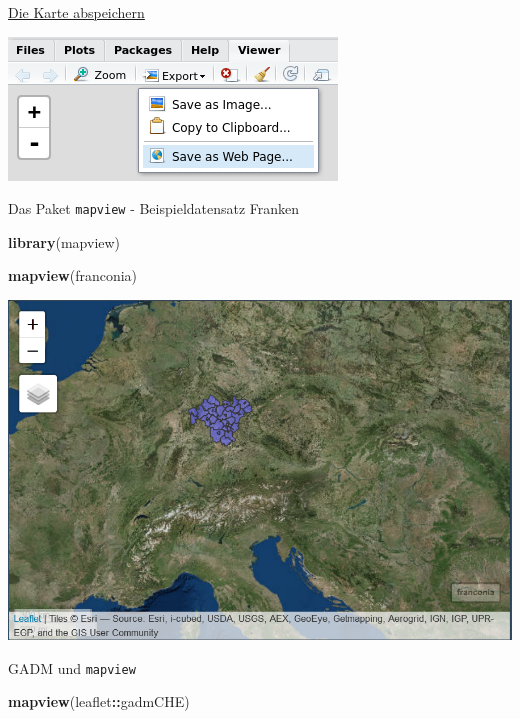 \documentclass[ignorenonframetext,]{beamer}
\newenvironment{Shaded}{\begin{snugshade}}{\end{snugshade}}
\newcommand{\KeywordTok}[1]{\textcolor[rgb]{0.13,0.29,0.53}{\textbf{#1}}}
\newcommand{\OperatorTok}[1]{\textcolor[rgb]{0.81,0.36,0.00}{\textbf{#1}}}
\newcommand{\NormalTok}[1]{#1}
\begin{document}
\begin{frame}{\href{http://www.r-bloggers.com/interactive-mapping-with-leaflet-in-r-2/}{Die
Karte abspeichern}}

\includegraphics{figure/snapshot2.png}

\end{frame}

\begin{frame}[fragile]{Das Paket \texttt{mapview} - Beispieldatensatz
Franken}

\begin{Shaded}
\begin{Highlighting}[]
\KeywordTok{library}\NormalTok{(mapview)}

\KeywordTok{mapview}\NormalTok{(franconia)}
\end{Highlighting}
\end{Shaded}

\includegraphics{figure/franconia.PNG}

\end{frame}

\begin{frame}[fragile]{GADM und \texttt{mapview}}

\begin{Shaded}
\begin{Highlighting}[]
\KeywordTok{mapview}\NormalTok{(leaflet}\OperatorTok{::}\NormalTok{gadmCHE)}
\end{Highlighting}
\end{Shaded}

\end{frame}
\end{document}
